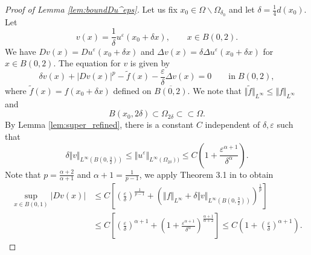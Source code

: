 \documentclass[12pt,reqno]{amsart}
\numberwithin{figure}{section}
\theoremstyle{plain}
\theoremstyle{remark}
\numberwithin{equation}{section}
\begin{document}
\begin{proof}[Proof of Lemma \ref{lem:boundDu^eps}] %
Let us fix $x_0 \in \Omega\backslash \Omega_{\delta_0}$ and let $\delta = \frac{1}{4}d(x_0)$. Let 
\begin{equation*}
    v(x) = \frac{1}{\delta}u^\varepsilon(x_0+\delta x), \qquad x\in B(0,2).   
\end{equation*}
We have $Dv(x) = Du^\varepsilon(x_0+\delta x)$ and $\Delta v(x) = \delta \Delta u^\varepsilon(x_0+\delta x)$ for $x\in B(0,2)$. The equation for $v$ is given by
\begin{equation*}
    \delta v(x) + |Dv(x)|^p - \tilde{f}(x) - \frac{\varepsilon}{\delta}\Delta v(x) = 0 \qquad\text{in}\;B(0,2),
\end{equation*}
where $\tilde{f}(x) = f(x_0+\delta x)$ defined on $\overline{B(0,2)}$. We note that $\Vert \tilde{f}\Vert_{L^\infty}\leq \Vert f\Vert_{L^\infty}$ and 
\begin{equation*}
    B(x_0,2\delta)\subset \Omega_{2\delta}\subset\subset\Omega.
\end{equation*}
By Lemma \ref{lem:super_refined}, there is a constant $C$ independent of $\delta,\varepsilon$ such that 
\begin{equation*}
     \delta\Vert v\Vert_{L^\infty\left(B\left(0,\frac{3}{2}\right)\right)} \leq \Vert u^\varepsilon\Vert_{L^\infty(\Omega_{2\delta}))} \leq C\left(1 + \frac{\varepsilon^{\alpha+1}}{\delta^\alpha}\right).
\end{equation*}
Note that $p = \frac{\alpha+2}{\alpha+1}$ and $\alpha+1 = \frac{1}{p-1}$, we apply Theorem 3.1 in \cite{Armstrong2015} to obtain 
\begin{equation*}
\begin{split}
    \sup_{x\in B(0,1)}|Dv(x)| &\leq C\left[\left(\frac{\varepsilon}{\delta}\right)^{\frac{1}{p-1}} + \left(\Vert f\Vert_{L^\infty}+\delta \Vert v\Vert_{L^\infty\left(B\left(0,\frac{3}{2}\right)\right)}\right)^{\frac{1}{p}}\right] \\
    &\leq C\left[\left(\frac{\varepsilon}{\delta}\right)^{\alpha+1} + \left(1+\frac{\varepsilon^{\alpha+1}}{\delta^\alpha}\right)^{\frac{\alpha+1}{\alpha+2}}\right]\leq C \left(1+\left(\frac{\varepsilon}{\delta}\right)^{\alpha+1}\right).
\end{split}

\end{equation*}
\end{proof}
\end{document}
